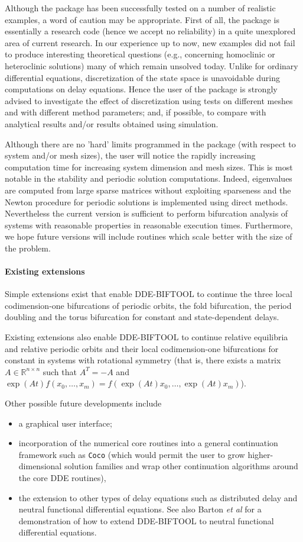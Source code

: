\documentclass[10pt]{scrartcl}
\newcommand{\DDEBIFCODE}{\textsc{DDE-BIFTOOL}}
\newcommand{\RR}{\mathbb{R}}
\begin{document}
{Although
the package has been successfully tested on a number of realistic examples,
a word of caution may be appropriate. First of all, the package
is essentially a research code (hence we accept no
reliability) in a quite unexplored area of current
research. In our experience up to now, 
new examples did not fail to produce
interesting theoretical questions (e.g., concerning homoclinic
or heteroclinic solutions) many of which
remain unsolved today. 
Unlike for ordinary differential equations, discretization
of the state space is unavoidable during computations on
delay equations. Hence the user of the package is 
strongly advised 
to investigate the effect of discretization using tests on different
meshes and with different method parameters; and, if
possible, to compare with analytical results and/or results obtained
using simulation.

Although there are no 'hard' limits programmed in the package (with
respect to system and/or mesh sizes), the user will notice the rapidly
increasing computation time for increasing system dimension and mesh
sizes.  This is most notable in the stability and periodic solution
computations.  Indeed, eigenvalues are computed from large sparse
matrices without exploiting sparseness and the Newton procedure for
periodic solutions is implemented using direct methods.  Nevertheless
the current version is sufficient to perform bifurcation analysis of
systems with reasonable properties in reasonable execution times.
Furthermore, we hope future versions will include routines which scale
better with the size of the problem.

\paragraph{Existing extensions}
Simple extensions exist that enable \DDEBIFCODE{} to continue the
three local codimension-one bifurcations of periodic orbits, the fold
bifurcation, the period doubling and the torus bifurcation for
constant and state-dependent delays.

Existing extensions also enable \DDEBIFCODE{} to continue relative equilibria
and relative periodic orbits and their local codimension-one
bifurcations for constant in systems with rotational symmetry (that
is, there exists a matrix $A\in\RR^{n\times n}$ such that $A^T=-A$ and
$\exp(At)f(x_0,\ldots,x_m)=f(\exp(At)x_0,\ldots,\exp(At)x_m)$).

Other possible future developments include
\begin{itemize}
\item a graphical user interface;
\item incorporation of the numerical core
  routines into a general continuation framework such as \texttt{Coco}
  \cite{DS13} (which would permit the user to grow higher-dimensional
  solution families and wrap other continuation algorithms around the
  core DDE routines),
\item the extension to other types of delay equations such as
  distributed delay and neutral functional differential equations. See
  also Barton \emph{et al} \cite{Barton06} for a demonstration of how
  to extend \DDEBIFCODE{} to neutral functional differential
  equations.
\end{itemize}
}
\end{document}
